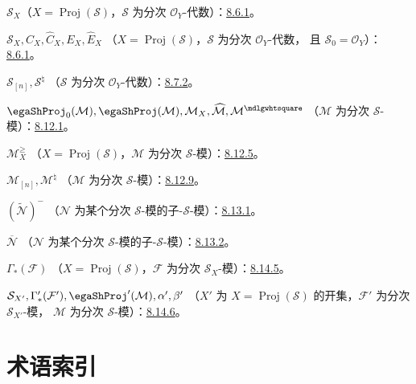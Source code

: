 \documentclass[UTF8,fontset=none,11pt,oneside,openany]{ctexbook}
\providecommand{\square}{\mdlgwhtsquare}
\providecommand{\Proj}{\operatorname{Proj}}
\newcommand{\oldpage}[2][]{%
  \hypertarget{ega-source-page-#1-#2}{}%
  \marginnote{\scriptsize\textbf{#1}~|~#2}\ignorespaces}
\begin{document}
$\mathcal{S}_X$（$X=\Proj(\mathcal{S})$，$\mathcal{S}$ 为分次 $\mathcal{O}_Y$-代数）：\hyperref[II.8.6.1-zh]{8.6.1}。

$\mathcal{S}_X,C_X,\widehat C_X,E_X,\widehat E_X$
（$X=\Proj(\mathcal{S})$，$\mathcal{S}$ 为分次 $\mathcal{O}_Y$-代数，
且 $\mathcal{S}_0=\mathcal{O}_Y$）：\hyperref[II.8.6.1-zh]{8.6.1}。

$\mathcal{S}_{[n]},\mathcal{S}^{\natural}$
（$\mathcal{S}$ 为分次 $\mathcal{O}_Y$-代数）：\hyperref[II.8.7.2-zh]{8.7.2}。

$\egaShProj_0(\mathcal{M}),\egaShProj(\mathcal{M}),\mathcal{M}_X,
\widehat{\mathcal{M}},\mathcal{M}^{\square}$
（$\mathcal{M}$ 为分次 $\mathcal{S}$-模）：\hyperref[II.8.12.1-zh]{8.12.1}。

$\mathcal{M}_X^\geq$
（$X=\Proj(\mathcal{S})$，$\mathcal{M}$ 为分次 $\mathcal{S}$-模）：\hyperref[II.8.12.5-zh]{8.12.5}。

$\mathcal{M}_{[n]},\mathcal{M}^{\natural}$
（$\mathcal{M}$ 为分次 $\mathcal{S}$-模）：\hyperref[II.8.12.9-zh]{8.12.9}。

$(\widetilde{\mathcal{N}})^-$
（$\mathcal{N}$ 为某个分次 $\mathcal{S}$-模的子-$\mathcal{S}$-模）：\hyperref[II.8.13.1-zh]{8.13.1}。

$\overline{\mathcal{N}}$
（$\mathcal{N}$ 为某个分次 $\mathcal{S}$-模的子-$\mathcal{S}$-模）：\hyperref[II.8.13.2-zh]{8.13.2}。

$\Gamma_*(\mathcal{F})$
（$X=\Proj(\mathcal{S})$，$\mathcal{F}$ 为分次 $\mathcal{S}_X$-模）：\hyperref[II.8.14.5-zh]{8.14.5}。

$\mathcal{S}_{X'},\Gamma'_*(\mathcal{F}'),\egaShProj'(\mathcal{M}),
\alpha',\beta'$
（$X'$ 为 $X=\Proj(\mathcal{S})$ 的开集，$\mathcal{F}'$ 为分次 $\mathcal{S}_{X'}$-模，
$\mathcal{M}$ 为分次 $\mathcal{S}$-模）：\hyperref[II.8.14.6-zh]{8.14.6}。

\endgroup

\clearpage
\oldpage[II]{209}
\thispagestyle{plain}
{}
\section*{术语索引}

\begingroup
\small
\setlength{\parindent}{0pt}
\setlength{\parskip}{2pt}
\newcommand{\egaTerme}[2]{\textbf{#1}：#2。\par}
\end{document}
